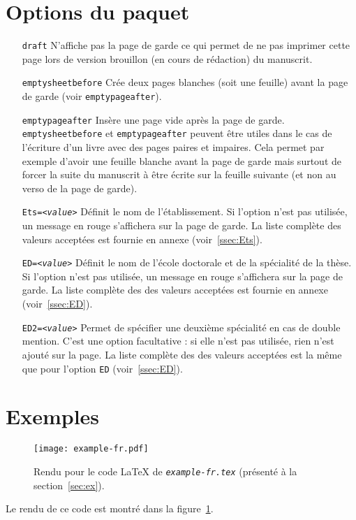 \documentclass{scrartcl}
\newcommand*{\opt}[1]{\texttt{#1}}
\newcommand*{\file}[1]{\textit{\texttt{#1}}}
\begin{document}
\section{Options du paquet}
\begin{enumerate}
  \item[\opt{draft}] N'affiche pas la page de garde ce qui permet de ne pas imprimer cette page lors de version brouillon (en cours de rédaction) du manuscrit.
	\item[\opt{emptysheetbefore}] Cr\'ee deux pages blanches (soit une feuille) avant la page de garde (voir \opt{emptypageafter}).
	\item[\opt{emptypageafter}] Ins\`ere une page vide apr\`es la page de garde. \\
		\opt{emptysheetbefore} et \opt{emptypageafter} peuvent \^etre utiles dans le cas de l'\'ecriture
        d'un livre avec des pages paires et impaires.
        Cela permet par exemple d'avoir une feuille blanche avant la page de garde mais surtout de forcer
        la suite du manuscrit \`a \^etre \'ecrite sur la feuille suivante (et non au verso de la page de garde).
    \item[\opt{Ets=\textit{<value>}}] D\'efinit le nom de l'\'etablissement. Si l'option n'est pas utilis\'ee, un message en rouge s'affichera sur la page de garde. La liste compl\`ete des valeurs accept\'ees est fournie en annexe (voir~\ref{ssec:Ets}).
    \item[\opt{ED=\textit{<value>}}] D\'efinit le nom de l'\'ecole doctorale et de la sp\'ecialit\'e de la th\`ese. Si l'option n'est pas utilis\'ee, un message en rouge s'affichera sur la page de garde. La liste compl\`ete des des valeurs accept\'ees est fournie en annexe (voir~\ref{ssec:ED}).
    \item[\opt{ED2=\textit{<value>}}] Permet de spécifier une deuxième spécialité en cas de double mention. C'est une option facultative : si elle n'est pas utilis\'ee, rien n'est ajout\'e sur la page. La liste compl\`ete des des valeurs accept\'ees est la m\^eme que pour l'option \opt{ED} (voir~\ref{ssec:ED}).
\end{enumerate}

\section{Exemples\label{sec:ex}}

\begin{figure}[h!]
    \centering
    \texttt{[image: example-fr.pdf]}
    \caption{\label{fig:ex}
        Rendu pour le code \LaTeX{} de \file{example-fr.tex} (pr\'esent\'e \`a la section~\ref{sec:ex}).
    }
\end{figure}
Le rendu de ce code est montr\'e dans la figure~\ref{fig:ex}.
\end{document}
